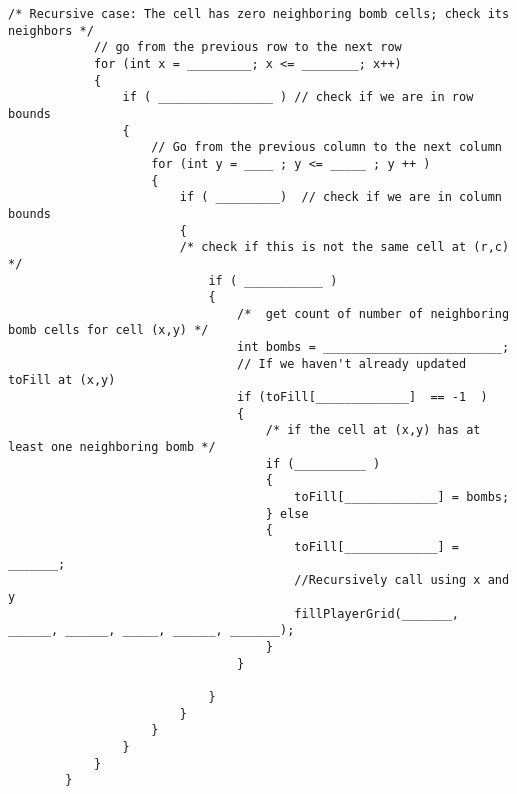 \documentclass{article}
\begin{document}
\begin{enumerate}[label=(\alph*), itemsep = 120pt]
\begin{lstlisting}[style=CStyle]
            /* Recursive case: The cell has zero neighboring bomb cells; check its neighbors */
            // go from the previous row to the next row
            for (int x = _________; x <= ________; x++)  
            {
                if ( ________________ ) // check if we are in row bounds
                {
                    // Go from the previous column to the next column
                    for (int y = ____ ; y <= _____ ; y ++ ) 
                    {
                        if ( _________)  // check if we are in column bounds
                        {
                        /* check if this is not the same cell at (r,c) */
                            if ( ___________ ) 
                            {   
                                /*  get count of number of neighboring bomb cells for cell (x,y) */
                                int bombs = _________________________; 
                                // If we haven't already updated toFill at (x,y)
                                if (toFill[_____________]  == -1  ) 
                                {
                                    /* if the cell at (x,y) has at least one neighboring bomb */
                                    if (__________ ) 
                                    {
                                        toFill[_____________] = bombs;
                                    } else
                                    {
                                        toFill[_____________] = _______;
                                        //Recursively call using x and y
                                        fillPlayerGrid(_______, ______, ______, _____, ______, _______); 
                                    }
                                }
                                
                            }
                        }
                    }
                }
            }
        }
    \end{lstlisting}

    
\end{enumerate}

\newpage
\end{document}
